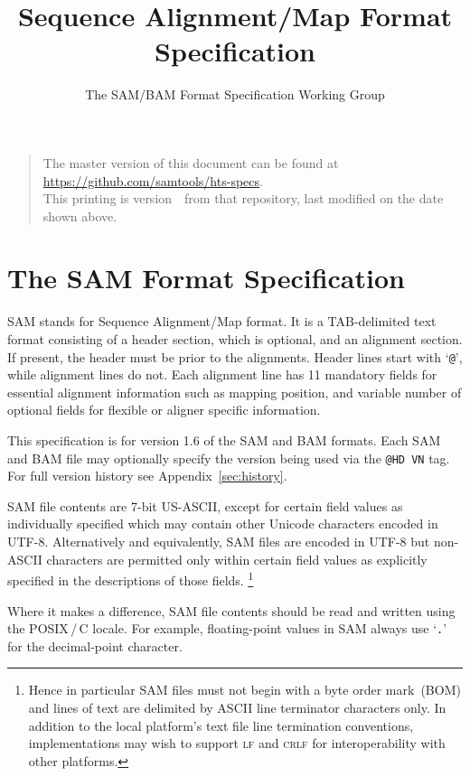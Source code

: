 \documentclass[10pt]{article}
\begin{document}

\title{Sequence Alignment/Map Format Specification}
\author{The SAM/BAM Format Specification Working Group}
\date{\headdate}
\maketitle
\begin{quote}\small
The master version of this document can be found at
\url{https://github.com/samtools/hts-specs}.\\
This printing is version~\commitdesc\ from that repository,
last modified on the date shown above.
\end{quote}
\vspace*{1em}


\section{The SAM Format Specification}
SAM stands for Sequence Alignment/Map format. It is a TAB-delimited text
format consisting of a header section, which is optional, and an
alignment section. If present, the header must be prior to the
alignments. Header lines start with `{\tt @}', while alignment lines do
not. Each alignment line has 11 mandatory fields for essential alignment
information such as mapping position, and variable number of optional
fields for flexible or aligner specific information.

This specification is for version 1.6 of the SAM and BAM formats.  Each SAM and
BAM file may optionally specify the version being used via the
{\tt @HD VN} tag. For full version history see Appendix~\ref{sec:history}. 

SAM file contents are 7-bit US-ASCII, except for certain field values as individually specified which may contain other Unicode characters encoded in UTF-8.
Alternatively and equivalently, SAM files are encoded in UTF-8 but non-ASCII characters are permitted only within certain field values as explicitly specified in the descriptions of those fields.%
\footnote{Hence in particular SAM files must not begin with a byte order mark~(BOM) and lines of text are delimited by ASCII line terminator characters only.
In addition to the local platform's text file line termination conventions, implementations may wish to support \textsc{lf} and \textsc{cr\>lf} for interoperability with other platforms.}

Where it makes a difference, SAM file contents should be read and written using the POSIX\,/\,C locale.
For example, floating-point values in SAM always use `{\tt .}' for the decimal-point character.
\end{document}
